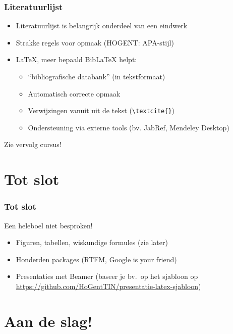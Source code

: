 \documentclass[aspectratio=169]{beamer}
\begin{document}
\begin{frame}[fragile]
  \frametitle{Literatuurlijst}

  \begin{itemize}
    \item<+-> Literatuurlijst is belangrijk onderdeel van een eindwerk
    \item<+-> Strakke regels voor opmaak (HOGENT: APA-stijl)
    \item<+-> {\LaTeX}, meer bepaald Bib{\LaTeX} helpt:
    \begin{itemize}
      \item<+-> ``bibliografische databank'' (in tekstformaat)
      \item<+-> Automatisch correcte opmaak
      \item<+-> Verwijzingen vanuit uit de tekst (\verb|\textcite{}|)
      \item<+-> Ondersteuning via externe tools (bv. JabRef, Mendeley Desktop)
    \end{itemize}
  \end{itemize}

  \pause Zie vervolg cursus!
\end{frame}

\section{Tot slot}

\begin{frame}[fragile]
 \frametitle{Tot slot}

  Een heleboel niet besproken!

  \begin{itemize}
    \item<+-> Figuren, tabellen, wiskundige formules (zie later)
    \item<+-> Honderden packages (RTFM, Google is your friend)
    \item<+-> Presentaties met Beamer (baseer je bv.\ op het sjabloon op \url{https://github.com/HoGentTIN/presentatie-latex-sjabloon})

  \end{itemize}
\end{frame}

\section{Aan de slag!}
\end{document}

